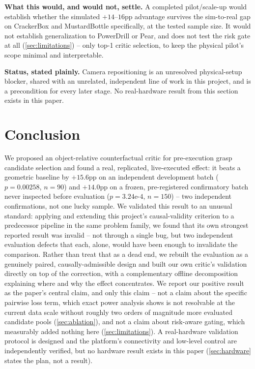 \documentclass[journal]{IEEEtran}
\begin{document}
\textbf{What this would, and would not, settle.} A completed pilot/scale-up
would establish whether the simulated $+14$--$16$pp advantage survives the
sim-to-real gap on CrackerBox and MustardBottle specifically, at the
tested sample size. It would not establish generalization to PowerDrill or
Pear, and does not test the risk gate at all (\cref{sec:limitations}) --
only top-1 critic selection, to keep the physical pilot's scope minimal and
interpretable.

\textbf{Status, stated plainly.} Camera repositioning is an unresolved
physical-setup blocker, shared with an unrelated, independent line of work
in this project, and is a precondition for every later stage. No
real-hardware result from this section exists in this paper.

\section{Conclusion}
\label{sec:conclusion}

We proposed an object-relative counterfactual critic for pre-execution
grasp candidate selection and found a real, replicated, live-executed
effect: it beats a geometric baseline by $+15.6$pp on an independent
development batch ($p{=}0.00258$, $n{=}90$) and $+14.0$pp on a frozen,
pre-registered confirmatory batch never inspected before evaluation
($p{=}3.24\text{e-}4$, $n{=}150$) -- two independent confirmations, not one
lucky sample. We validated this result to an unusual standard: applying
and extending this project's causal-validity criterion to a predecessor
pipeline in the same problem family, we found that its own strongest
reported result was invalid -- not through a single bug, but two
independent evaluation defects that each, alone, would have been enough to
invalidate the comparison. Rather than treat that as a dead end, we
rebuilt the evaluation as a genuinely paired, causally-admissible design
and built our own critic's validation directly on top of the correction,
with a complementary offline decomposition explaining where and why the
effect concentrates. We report our positive result as the paper's central
claim, and only this claim -- not a claim about the specific pairwise loss
term, which exact power analysis shows is not resolvable at the current
data scale without roughly two orders of magnitude more evaluated
candidate pools (\cref{sec:ablation}), and not a claim about risk-aware
gating, which measurably added nothing here (\cref{sec:limitations}). A
real-hardware validation protocol is designed and the platform's
connectivity and low-level control are independently verified, but no
hardware result exists in this paper (\cref{sec:hardware} states the plan,
not a result).
\end{document}
